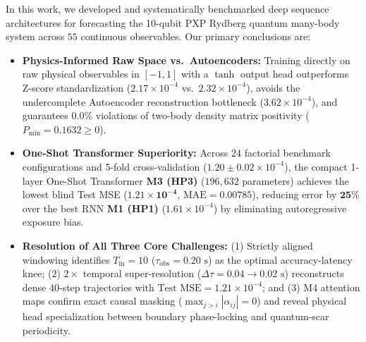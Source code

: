 \documentclass[10pt,a4paper]{article}
\begin{document}
In this work, we developed and systematically benchmarked deep sequence architectures for forecasting the 10-qubit PXP Rydberg quantum many-body system across $55$ continuous observables. Our primary conclusions are:
\begin{itemize}[leftmargin=*, itemsep=1.5pt, topsep=2pt]
    \item \textbf{Physics-Informed Raw Space vs.\ Autoencoders:} Training directly on raw physical observables in $[-1, 1]$ with a $\tanh$ output head outperforms Z-score standardization ($2.17 \times 10^{-4}$ vs.\ $2.32 \times 10^{-4}$), avoids the undercomplete Autoencoder reconstruction bottleneck ($3.62 \times 10^{-4}$), and guarantees $0.0\%$ violations of two-body density matrix positivity ($P_{\min} = 0.1632 \ge 0$).
    \item \textbf{One-Shot Transformer Superiority:} Across 24 factorial benchmark configurations and 5-fold cross-validation ($1.20 \pm 0.02 \times 10^{-4}$), the compact 1-layer One-Shot Transformer \textbf{M3 (HP3)} ($196{,}632$ parameters) achieves the lowest blind Test MSE ($\mathbf{1.21 \times 10^{-4}}$, $\text{MAE} = 0.00785$), reducing error by $\mathbf{25\%}$ over the best RNN \textbf{M1 (HP1)} ($1.61 \times 10^{-4}$) by eliminating autoregressive exposure bias.
    \item \textbf{Resolution of All Three Core Challenges:} (1) Strictly aligned windowing identifies $T_{\text{in}} = 10$ ($\tau_{\text{obs}} = 0.20\text{ s}$) as the optimal accuracy-latency knee; (2) $2\times$ temporal super-resolution ($\Delta \tau = 0.04 \to 0.02\text{ s}$) reconstructs dense 40-step trajectories with $\text{Test MSE} = 1.21 \times 10^{-4}$; and (3) M4 attention maps confirm exact causal masking ($\max_{j>i}|\alpha_{ij}| = 0$) and reveal physical head specialization between boundary phase-locking and quantum-scar periodicity.
\end{itemize}
\end{document}
